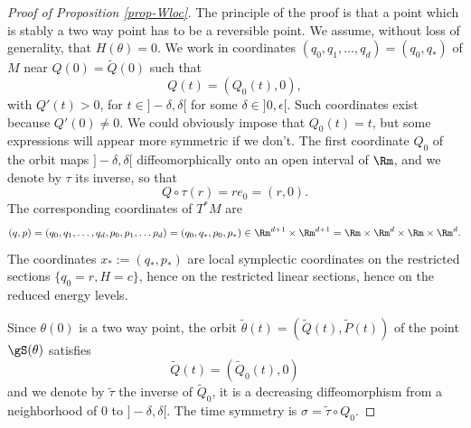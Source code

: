 \begin{proof}[Proof of Proposition \ref{prop-Wloc}]
The principle of the proof is that a point which is stably a two way point has to be a reversible point.
We assume, without loss of generality, that $H(\theta)=0$.
We work in coordinates $(q_0, q_1, \ldots,q_d)=(q_0, q_*)$ of $M$ near $Q(0)=\tilde Q(0)$ such that
\[
 Q(t)=(Q_0(t),0),\]
with $Q'(t)>0$, for $t\in{}]-\delta, \delta[$ for some $\delta\in{}]0,\epsilon[$. Such coordinates exist because $ Q'(0)\neq 0$.
We could obviously impose that $Q_0(t)=t$, but some expressions will appear more symmetric if we don't.
The first coordinate $Q_0$ of the orbit maps $]-\delta, \delta[$ diffeomorphically onto an open interval of $\Rm$, and we denote by $\tau $
its inverse, so that
\[
Q\circ \tau (r)=re_0=(r,0).\]
The corresponding coordinates of $T^*M$ are
\[
(q,p)=(q_0,q_1,\ldots,q_d,p_0, p_1, \ldots p_d)=(q_0, q_*, p_0, p_*)
\in \Rm^{d+1}\times \Rm^{d+1}=\Rm\times \Rm^d\times \Rm \times \Rm^d.
\]
The coordinates $x_*:= (q_*,p_*)$ are local symplectic coordinates on the restricted sections $\{q_0=r, H=c\}$,
hence on the restricted linear sections, hence on the reduced energy levels.

Since $\theta(0)$ is a two way point, the orbit $\tilde \theta(t)=(\tilde Q(t), \tilde P(t))$ of the point $\gS(\theta)$ satisfies
\[
\tilde Q(t)=(\tilde Q_0(t), 0)
\]
and we denote by $\tilde \tau$ the inverse of $\tilde Q_0$, it is a decreasing diffeomorphism from a neighborhood of $0$ to $]-\delta, \delta[$. The time symmetry is $\sigma=\tilde \tau \circ Q_0$.


\end{proof}
